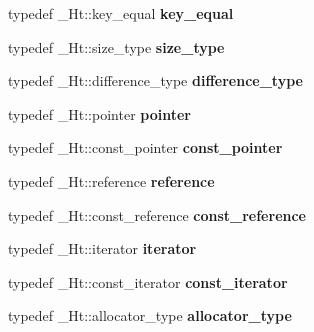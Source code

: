 \begin{DoxyCompactItemize}
typedef \+\_\+\+Ht\+::key\+\_\+equal {\bfseries key\+\_\+equal}
\item 
\mbox{\label{classhash__multimap_afcc4aab095cd06d4cc2610fdaa81d740}} 
typedef \+\_\+\+Ht\+::size\+\_\+type {\bfseries size\+\_\+type}
\item 
\mbox{\label{classhash__multimap_a53b5b9c87a773efb627bc3d80d2d4ea7}} 
typedef \+\_\+\+Ht\+::difference\+\_\+type {\bfseries difference\+\_\+type}
\item 
\mbox{\label{classhash__multimap_a1b3b4f2131db73f1a54abbea00bf6e43}} 
typedef \+\_\+\+Ht\+::pointer {\bfseries pointer}
\item 
\mbox{\label{classhash__multimap_ab20275dc10726fe3252a53965d9c55cb}} 
typedef \+\_\+\+Ht\+::const\+\_\+pointer {\bfseries const\+\_\+pointer}
\item 
\mbox{\label{classhash__multimap_afbe4b7ca273f40a2ac784f6911018f9e}} 
typedef \+\_\+\+Ht\+::reference {\bfseries reference}
\item 
\mbox{\label{classhash__multimap_a1da61b5f67f139699549efc7dda1bbde}} 
typedef \+\_\+\+Ht\+::const\+\_\+reference {\bfseries const\+\_\+reference}
\item 
\mbox{\label{classhash__multimap_a2b3f502b58fb009817a860c36b74d7a7}} 
typedef \+\_\+\+Ht\+::iterator {\bfseries iterator}
\item 
\mbox{\label{classhash__multimap_a96063e25c09dcb644270ef7c439ed124}} 
typedef \+\_\+\+Ht\+::const\+\_\+iterator {\bfseries const\+\_\+iterator}
\item 
\mbox{\label{classhash__multimap_a3f4f654a6b1ea8e0f056b642ba6a47f3}} 
typedef \+\_\+\+Ht\+::allocator\+\_\+type {\bfseries allocator\+\_\+type}
\end{DoxyCompactItemize}
